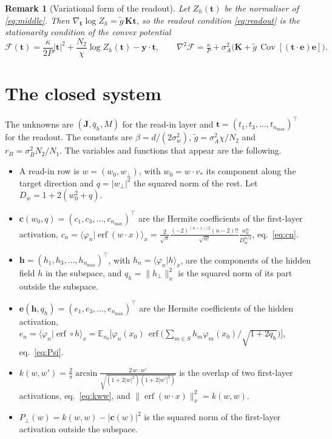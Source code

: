\documentclass[11pt,a4paper]{article}
\newtheorem{remark}{Remark}
\newcommand{\E}{\mathbb{E}}
\newcommand{\erf}{\operatorname{erf}}
\begin{document}
\begin{remark}[Variational form of the readout]
Let $Z_h(\mathbf t)$ be the normaliser of \eqref{eq:middle}.
Then $\nabla_{\mathbf t}\log Z_h=\tilde g\,\mathbf K\mathbf t$, so the readout condition \eqref{eq:readout} is the stationarity condition of the convex potential
\begin{equation}
  \mathcal F(\mathbf t)=\frac{\kappa}{2P}|\mathbf t|^2+\frac{N_2}{\chi}\log Z_h(\mathbf t)-\mathbf y\cdot \mathbf t,
  \qquad
  \nabla^2\mathcal F=\tfrac\kappa P+\sigma_A^2\big(\mathbf K+\tilde g\,\operatorname{Cov}[(\mathbf t\cdot\mathbf e)\mathbf e]\big).
\end{equation}
\end{remark}

\section{The closed system}
The unknowns are $(\mathbf J,\bar q_h,M)$ for the read-in layer and $\mathbf t=(t_1,t_3,\dots,t_{n_{\max}})^\top$ for the readout.
The constants are $\beta=d/(2\sigma_w^2)$, $\tilde g=\sigma_A^2\chi/N_2$ and $r_B=\sigma_B^2N_2/N_1$.
The variables and functions that appear are the following.
\begin{itemize}
  \item A read-in row is $w=(w_0,w_\perp)$, with $w_0=w\cdot v_*$ its component along the target direction and
    $q=|w_\perp|^2$ the squared norm of the rest. Let $D_w=1+2(w_0^2+q)$.
  \item $\mathbf c(w_0,q)=(c_1,c_3,\dots,c_{n_{\max}})^\top$ are the Hermite coefficients of the first-layer activation,
    $c_n=\langle\varphi_n|\erf(w\cdot x)\rangle_x
    =\frac{2}{\sqrt\pi}\frac{(-2)^{(n-1)/2}(n-2)!!}{\sqrt{n!}}\frac{w_0^n}{D_w^{n/2}}$, eq.~\eqref{eq:cn}.
  \item $\mathbf h=(h_1,h_3,\dots,h_{n_{\max}})^\top$, with $h_n=\langle\varphi_n|h\rangle_x$, are the components of the hidden field
    $h$ in the subspace, and $q_h=\|h_\perp\|_x^2$ is the squared norm of its part outside the subspace.
  \item $\mathbf e(\mathbf h,q_h)=(e_1,e_3,\dots,e_{n_{\max}})^\top$ are the Hermite coefficients of the hidden activation,
    $e_n=\langle\varphi_n|\erf\circ h\rangle_x
    =\E_{x_0}\big[\varphi_n(x_0)\,\erf\big(\sum_{m\in S}h_m\varphi_m(x_0)/\sqrt{1+2q_h}\big)\big]$, eq.~\eqref{eq:Psi}.
  \item $k(w,w')=\frac2\pi\arcsin\frac{2\,w\cdot w'}{\sqrt{(1+2|w|^2)(1+2|w'|^2)}}$ is the overlap of two first-layer
    activations, eq.~\eqref{eq:kww}, and $\|\erf(w\cdot x)\|_x^2=k(w,w)$.
  \item $P_\perp(w)=k(w,w)-|\mathbf c(w)|^2$ is the squared norm of the first-layer activation outside the subspace.
\end{itemize}
\end{document}
